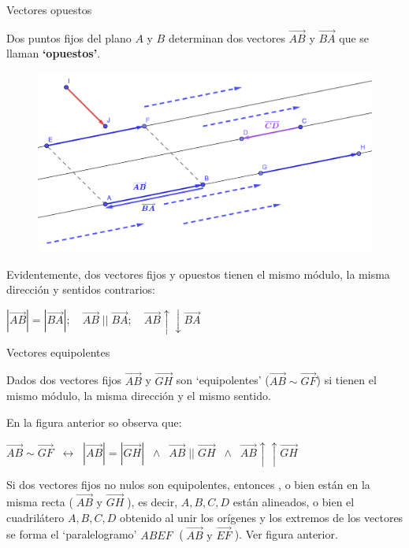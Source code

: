 \begin{defi}{Vectores opuestos}

Dos puntos fijos del plano $A$ y $B$ determinan dos vectores $\overrightarrow {AB}$ y $\overrightarrow {BA}$ que se llaman \textbf{`opuestos'}.
	
\end{defi}

\begin{figure}[H]
	\centering
	\includegraphics[width=.80\textwidth]{imagenes/imagenes09/T09IM01.png}
\end{figure}



Evidentemente, dos vectores fijos y opuestos tienen el mismo módulo, la misma dirección y sentidos contrarios:

$|\overrightarrow {AB}|=|\overrightarrow {BA}|; \quad \overrightarrow {AB}\; ||\; \overrightarrow {BA}; \quad \overrightarrow {AB} \uparrow\downarrow \overrightarrow {BA}$

\begin{defi}{Vectores equipolentes}

Dados dos vectores fijos $\overrightarrow {AB}$ y $\overrightarrow {GH}$ son `equipolentes' ($\overrightarrow {AB} \boldsymbol{\sim} \overrightarrow {GF}$) si tienen el mismo módulo, la misma dirección y el mismo sentido.
\end{defi}

En la figura anterior so observa que: 

$\overrightarrow {AB} \boldsymbol{\sim} \overrightarrow {GF} \;\; \longleftrightarrow \;\; 
|\overrightarrow {AB}|=|\overrightarrow {GH}| \;\; \wedge \;\; \overrightarrow {AB} \;||\; \overrightarrow {GH} \;\; \wedge \;\; \overrightarrow {AB} \uparrow\uparrow \overrightarrow {GH}$



\begin{prop}
	Si dos vectores fijos no nulos son equipolentes, entonces , o bien están en la misma recta ($\; \overrightarrow {AB} \text{ y } \overrightarrow {GH}\;$), es decir, $A,B,C,D$ están alineados, o bien el cuadrilátero $A,B,C,D$ obtenido al unir los orígenes y los extremos de los vectores se forma el `paralelogramo' $ABEF\; $ ($\; \overrightarrow {AB} \text{ y } \overrightarrow {EF}\;$). Ver figura anterior.
\end{prop}



